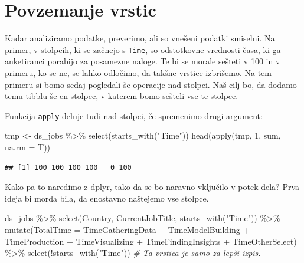 \documentclass[
]{book}
\newenvironment{Shaded}{\begin{snugshade}}{\end{snugshade}}
\newcommand{\AttributeTok}[1]{\textcolor[rgb]{0.77,0.63,0.00}{#1}}
\newcommand{\CommentTok}[1]{\textcolor[rgb]{0.56,0.35,0.01}{\textit{#1}}}
\newcommand{\DecValTok}[1]{\textcolor[rgb]{0.00,0.00,0.81}{#1}}
\newcommand{\FunctionTok}[1]{\textcolor[rgb]{0.00,0.00,0.00}{#1}}
\newcommand{\NormalTok}[1]{#1}
\newcommand{\OtherTok}[1]{\textcolor[rgb]{0.56,0.35,0.01}{#1}}
\newcommand{\SpecialCharTok}[1]{\textcolor[rgb]{0.00,0.00,0.00}{#1}}
\newcommand{\StringTok}[1]{\textcolor[rgb]{0.31,0.60,0.02}{#1}}
\begin{document}
\hypertarget{povzemanje-vrstic}{%
\section{Povzemanje vrstic}\label{povzemanje-vrstic}}

Kadar analiziramo podatke, preverimo, ali so vnešeni podatki smiselni. Na primer, v stolpcih, ki se začnejo s \texttt{Time}, so odstotkovne vrednosti časa, ki ga anketiranci porabijo za posamezne naloge. Te bi se morale sešteti v 100 in v primeru, ko se ne, se lahko odločimo, da takšne vrstice izbrišemo. Na tem primeru si bomo sedaj pogledali še operacije nad stolpci. Naš cilj bo, da dodamo temu tibblu še en stolpec, v katerem bomo sešteli vse te stolpce.

Funkcija \texttt{apply} deluje tudi nad stolpci, če spremenimo drugi argument:

\begin{Shaded}
\begin{Highlighting}[]
\NormalTok{tmp }\OtherTok{\textless{}{-}}\NormalTok{ ds\_jobs }\SpecialCharTok{\%\textgreater{}\%}
  \FunctionTok{select}\NormalTok{(}\FunctionTok{starts\_with}\NormalTok{(}\StringTok{"Time"}\NormalTok{))}
\FunctionTok{head}\NormalTok{(}\FunctionTok{apply}\NormalTok{(tmp, }\DecValTok{1}\NormalTok{, sum, }\AttributeTok{na.rm =}\NormalTok{ T))}
\end{Highlighting}
\end{Shaded}

\begin{verbatim}
## [1] 100 100 100 100   0 100
\end{verbatim}

Kako pa to naredimo z dplyr, tako da se bo naravno vključilo v potek dela? Prva ideja bi morda bila, da enostavno naštejemo vse stolpce.

\begin{Shaded}
\begin{Highlighting}[]
\NormalTok{ds\_jobs }\SpecialCharTok{\%\textgreater{}\%}
  \FunctionTok{select}\NormalTok{(Country, CurrentJobTitle, }\FunctionTok{starts\_with}\NormalTok{(}\StringTok{"Time"}\NormalTok{)) }\SpecialCharTok{\%\textgreater{}\%}
  \FunctionTok{mutate}\NormalTok{(}\AttributeTok{TotalTime =}\NormalTok{ TimeGatheringData }\SpecialCharTok{+}\NormalTok{ TimeModelBuilding }\SpecialCharTok{+}\NormalTok{ TimeProduction }\SpecialCharTok{+} 
\NormalTok{           TimeVisualizing }\SpecialCharTok{+}\NormalTok{ TimeFindingInsights }\SpecialCharTok{+}\NormalTok{ TimeOtherSelect) }\SpecialCharTok{\%\textgreater{}\%}
  \FunctionTok{select}\NormalTok{(}\SpecialCharTok{!}\FunctionTok{starts\_with}\NormalTok{(}\StringTok{"Time"}\NormalTok{)) }\CommentTok{\# Ta vrstica je samo za lepši izpis.}
\end{Highlighting}
\end{Shaded}
\end{document}
